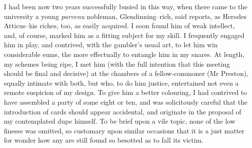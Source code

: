 \documentclass[12pt]{book}
\begin{document}
     I had been now two years successfully busied in this way, when
there came to the university a young \emph{parvenu} nobleman,
Glendinning--rich, said reports, as Herodes Atticus--his riches,
too, as easily acquired.  I soon found him of weak intellect, and,
of course, marked him as a fitting subject for my skill.  I
frequently engaged him in play, and contrived, with the gambler's
usual art, to let him win considerable sums, the more effectually
to entangle him in my snares.  At length, my schemes being ripe, I
met him (with the full intention that this meeting should be final
and decisive) at the chambers of a fellow-commoner (Mr Preston),
equally intimate with both, but who, to do him justice, entertained
not even a remote suspicion of my design.  To give him a better
colouring, I had contrived to have assembled a party of some eight
or ten, and was solicitously careful that the introduction of cards
should appear accidental, and originate in the proposal of my
contemplated dupe himself.  To be brief upon a vile topic, none of
the low finesse was omitted, so customary upon similar occasions
that it is a just matter for wonder how any are still found so
besotted as to fall its victim.
\end{document}
